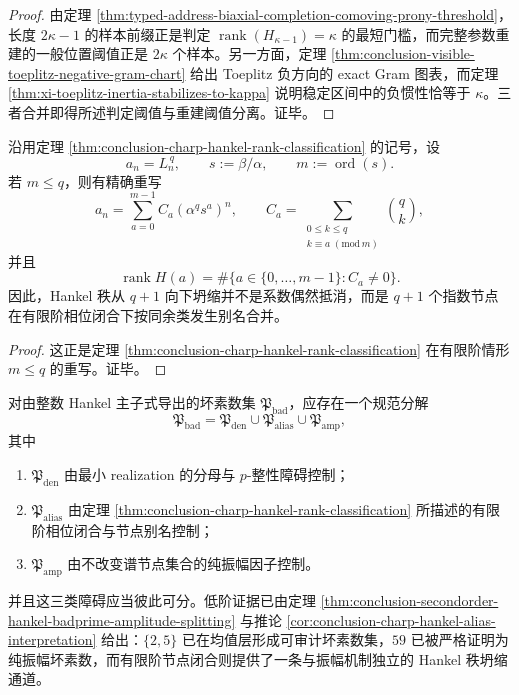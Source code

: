 \begin{proof}
由定理 \ref{thm:typed-address-biaxial-completion-comoving-prony-threshold}，长度 \(2\kappa-1\) 的样本前缀正是判定 \(\operatorname{rank}(H_{\kappa-1})=\kappa\) 的最短门槛，而完整参数重建的一般位置阈值正是 \(2\kappa\) 个样本。另一方面，定理 \ref{thm:conclusion-visible-toeplitz-negative-gram-chart} 给出 Toeplitz 负方向的 exact Gram 图表，而定理 \ref{thm:xi-toeplitz-inertia-stabilizes-to-kappa} 说明稳定区间中的负惯性恰等于 \(\kappa\)。三者合并即得所述判定阈值与重建阈值分离。证毕。
\end{proof}

\begin{corollary}\label{cor:conclusion-charp-hankel-alias-interpretation}
沿用定理 \ref{thm:conclusion-charp-hankel-rank-classification} 的记号，设
\[
a_n=L_n^{\,q},
\qquad
s:=\beta/\alpha,
\qquad
m:=\operatorname{ord}(s).
\]
若 \(m\le q\)，则有精确重写
\[
a_n
=
\sum_{a=0}^{m-1}C_a(\alpha^q s^a)^n,
\qquad
C_a=
\sum_{\substack{0\le k\le q\\ k\equiv a\;(\mathrm{mod}\,m)}}\binom{q}{k},
\]
并且
\[
\operatorname{rank}H(a)
=
\#\{a\in\{0,\dots,m-1\}:C_a\neq 0\}.
\]
因此，Hankel 秩从 \(q+1\) 向下坍缩并不是系数偶然抵消，而是 \(q+1\) 个指数节点在有限阶相位闭合下按同余类发生别名合并。
\end{corollary}

\begin{proof}
这正是定理 \ref{thm:conclusion-charp-hankel-rank-classification} 在有限阶情形 \(m\le q\) 的重写。证毕。
\end{proof}

\begin{conjecture}\label{conj:conclusion-hankel-badprime-denominator-alias-amplitude-splitting}
对由整数 Hankel 主子式导出的坏素数集 \(\mathfrak P_{\mathrm{bad}}\)，应存在一个规范分解
\[
\mathfrak P_{\mathrm{bad}}
=
\mathfrak P_{\mathrm{den}}
\cup
\mathfrak P_{\mathrm{alias}}
\cup
\mathfrak P_{\mathrm{amp}},
\]
其中
\begin{enumerate}
\normalfont
  \item \(\mathfrak P_{\mathrm{den}}\) 由最小 realization 的分母与 \(p\)-整性障碍控制；
  \item \(\mathfrak P_{\mathrm{alias}}\) 由定理 \ref{thm:conclusion-charp-hankel-rank-classification} 所描述的有限阶相位闭合与节点别名控制；
  \item \(\mathfrak P_{\mathrm{amp}}\) 由不改变谱节点集合的纯振幅因子控制。
\end{enumerate}
并且这三类障碍应当彼此可分。低阶证据已由定理 \ref{thm:conclusion-secondorder-hankel-badprime-amplitude-splitting} 与推论 \ref{cor:conclusion-charp-hankel-alias-interpretation} 给出：\(\{2,5\}\) 已在均值层形成可审计坏素数集，\(59\) 已被严格证明为纯振幅坏素数，而有限阶节点闭合则提供了一条与振幅机制独立的 Hankel 秩坍缩通道。
\end{conjecture}

\endinput
